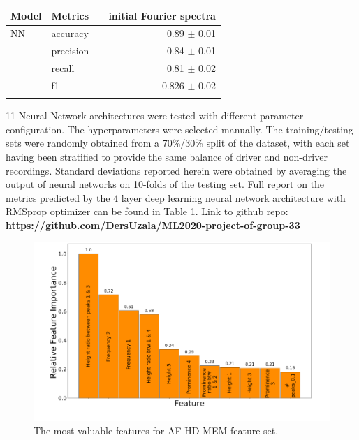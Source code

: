 \documentclass{article}
\begin{document}
\begin{table}[t]
\begin{center}
\begin{small}
\begin{sc}
\begin{tabular}{l{1cm}p{2cm}p{2cm}r{2cm}}
\toprule
Model & Metrics && initial Fourier spectra\\
\midrule
NN        &accuracy  &&0.89 $\pm$ 0.01\\
&precision &&0.84 $\pm$ 0.01\\
&recall    &&0.81 $\pm$ 0.02\\
&f1        &&0.826 $\pm$ 0.02\\\\
\bottomrule
\end{tabular}
\end{sc}
\end{small}
\end{center}
\vskip -0.1in
\end{table}

11 Neural Network architectures were tested with different parameter 
configuration. The hyperparameters were selected manually. The training/testing sets were randomly obtained
from a 70\%/30\% split of the dataset, with each set having
been stratified to provide the same balance of driver and
non-driver recordings. Standard deviations reported herein
were obtained by averaging the output of neural networks on
10-folds of the testing set.  Full report on the metrics predicted by the 4 layer deep learning neural network architecture with RMSprop optimizer can be found in Table 1. 
Link to github repo: \textbf{https://github.com/DersUzala/ML2020-project-of-group-33}

\begin{figure}[ht]
\vskip 0.2in
\begin{center}
\centerline{\includegraphics[width=\columnwidth]{image4.png}}
\caption{The most valuable features for AF HD MEM feature set.}
\label{icml-historical}
\end{center}
\vskip -0.2in
\end{figure}
\end{document}
